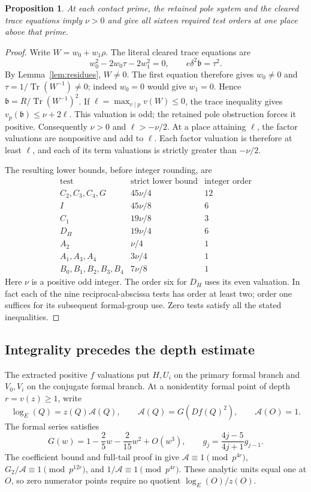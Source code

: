 \documentclass[11pt,a4paper]{article}
\newtheorem{proposition}[theorem]{Proposition}
\DeclareMathOperator{\Tr}{Tr}\DeclareMathOperator{\Nm}{Nm}
\begin{document}
\begin{proposition}\label{prop:extract}
At each contact prime, the retained pole system and the cleared trace
equations imply $\nu>0$ and give all sixteen required test orders at
one place above that prime.
\end{proposition}
\begin{proof}
Write $W=w_0+w_1\rho$. The literal cleared trace equations are
\[
 w_0^2-2w_0\tau-2w_1^2=0,\qquad e\delta^2\mathfrak b=\tau^2.
\]
By Lemma~\ref{lem:residues}, $W\ne0$. The first equation therefore
gives $w_0\ne0$ and $\tau=1/\Tr(W^{-1})\ne0$; indeed $w_0=0$
would give $w_1=0$. Hence
$\mathfrak b=R/\Tr(W^{-1})^2$. If
$\ell=\max_{v\mid p}v(W)\le0$, the trace inequality gives
$v_p(\mathfrak b)\le\nu+2\ell$.
This valuation is odd; the retained pole obstruction forces it positive.
Consequently $\nu>0$ and $\ell>-\nu/2$.
At a place attaining $\ell$, the factor valuations are nonpositive
and add to $\ell$. Each factor valuation is therefore at least $\ell$,
and each of its term valuations is strictly greater than $-\nu/2$.

The resulting lower bounds, before integer rounding, are
\[
\begin{array}{c|c|c}
\text{test}&\text{strict lower bound}&\text{integer order}\\\hline
C_2,C_3,C_4,G&45\nu/4&12\\
I&45\nu/8&6\\
C_1&19\nu/8&3\\
D_H&19\nu/4&6\\
A_2&\nu/4&1\\
A_1,A_3,A_4&3\nu/4&1\\
B_0,B_1,B_2,B_3,B_4&7\nu/8&1
\end{array}
\]
Here $\nu$ is a positive odd integer. The order six for $D_H$ uses
its even valuation. In fact each of the nine reciprocal-abscissa
tests has order at least two; order one suffices for its subsequent
formal-group use. Zero tests satisfy all the stated inequalities.
\end{proof}

\subsection{Integrality precedes the depth estimate}
The extracted positive $f$ valuations put $H,U_i$ on the primary
formal branch and $V_0,V_i$ on the conjugate formal branch.
At a nonidentity formal point of depth $r=v(z)\ge1$, write
\[
 \log_E(Q)=z(Q)\mathcal A(Q),\qquad
 \mathcal A(Q)=G(Df(Q)^2),\qquad \mathcal A(O)=1.
\]
The formal series satisfies
\[
 G(w)=1-\frac25w-\frac2{15}w^2+O(w^3),\qquad
 g_j=\frac{4j-5}{4j+1}g_{j-1}.
\]
The coefficient bound and full-tail proof in \cite[Lemma 3.1]{Even}
give $\mathcal A\equiv1\pmod{p^{4r}}$,
$G_2/\mathcal A\equiv1\pmod{p^{12r}}$, and
$1/\mathcal A\equiv1\pmod{p^{4r}}$.
These analytic units equal one at $O$, so zero numerator points
require no quotient $\log_E(O)/z(O)$.
\end{document}
